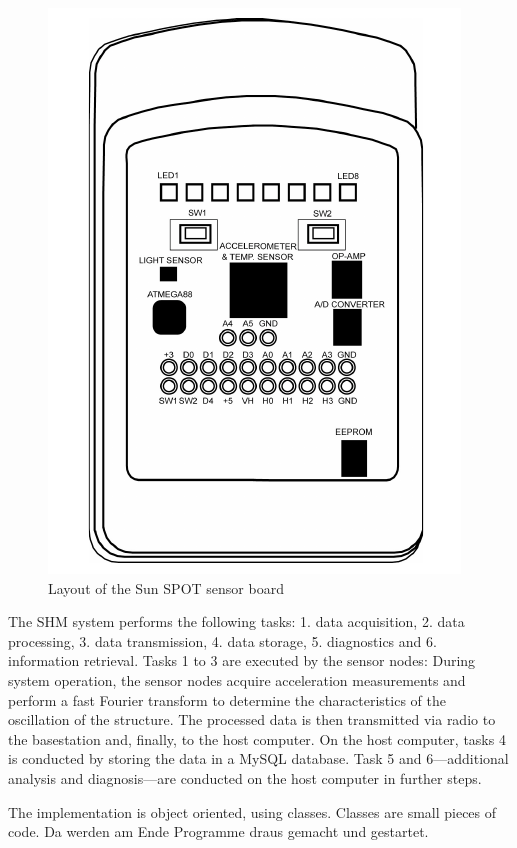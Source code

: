 \documentclass[12pt,a4paper]{scrartcl}
\begin{document}
\begin{figure}[htb]
    \centering
    \includegraphics[scale=0.5]{figures/eDemoboard.png}
    \caption{Layout of the Sun SPOT sensor board}
    \label{fig:SPOT}
\end{figure}

The SHM system performs the following tasks:
1. data acquisition,
2. data processing,
3. data transmission, 
4. data storage,
5. diagnostics and 
6. information retrieval.
Tasks 1 to 3 are executed by the sensor nodes: During system operation, the sensor nodes acquire acceleration measurements and perform a fast Fourier transform to determine the characteristics of the oscillation of the structure. The processed data is then transmitted via radio to the basestation and, finally, to the host computer.
On the host computer, tasks 4 is conducted by storing the data in a MySQL database.
Task 5 and 6---additional analysis and diagnosis---are conducted on the host computer in further steps.

The implementation is object oriented, using classes. Classes are small pieces of code.
Da werden am Ende Programme draus gemacht und gestartet.
\end{document}
